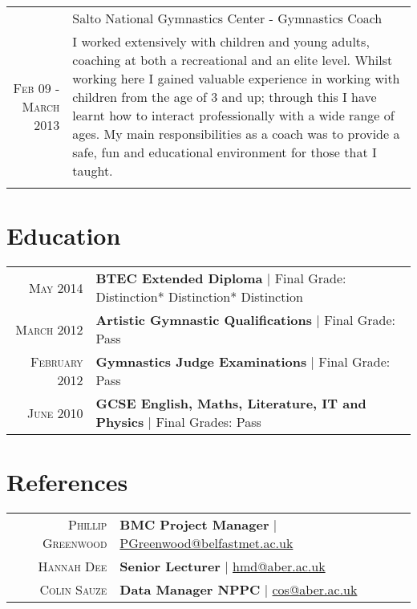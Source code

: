 \documentclass[a4paper,10pt]{article}
\begin{document}
\begin{longtable}{r|p{11cm}}
  &Salto National Gymnastics Center - Gymnastics Coach \\\textsc{Feb 09 - March 2013}
  &\footnotesize{I worked extensively with children and young adults, coaching at both a recreational and an elite level. Whilst working here I gained valuable experience in working with children from the age of 3 and up; through this I have learnt how to interact professionally with a wide range of ages. My main responsibilities as a coach was to provide a safe, fun and educational environment for those that I taught.}\\\multicolumn{2}{c}{} \\
\end{longtable}

\section{Education}
\begin{tabular}{rl}	
  \textsc{May} 2014& \textbf{BTEC Extended Diploma} | Final Grade: Distinction* Distinction* Distinction
  \\
  \textsc{March} 2012& \textbf{Artistic Gymnastic Qualifications} | Final Grade: Pass
  \\
  \textsc{February} 2012& \textbf{Gymnastics Judge Examinations} | Final Grade: Pass
  \\
  \textsc{June} 2010& \textbf{GCSE English, Maths, Literature, IT and Physics} | Final Grades: Pass
\end{tabular}



\section{References}
\begin{tabular}{rl}	
  \textsc{Phillip Greenwood} & \textbf{BMC Project Manager} | \href{PGreenwood@belfastmet.ac.uk}{PGreenwood@belfastmet.ac.uk}
  \\
  \textsc{Hannah Dee} & \textbf{Senior Lecturer} | \href{hmd@aber.ac.uk}{hmd@aber.ac.uk}
  \\
  \textsc{Colin Sauze} & \textbf{Data Manager NPPC} | \href{cos@aber.ac.uk}{cos@aber.ac.uk}

\end{tabular}
\end{document}

